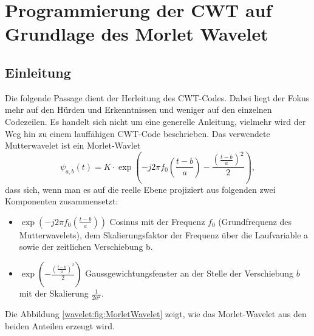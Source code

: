 %
%
%
%
\section{Programmierung der CWT auf Grundlage des Morlet Wavelet 
\label{wavelets:section:teil2}}

\subsection{Einleitung
\label{wavelets:subsection:Einleitung}}
Die folgende Passage dient der Herleitung des CWT-Codes. Dabei liegt der Fokus mehr auf den Hürden und Erkenntnissen und weniger auf den einzelnen Codezeilen. Es handelt sich nicht um eine generelle Anleitung, vielmehr wird der Weg hin zu einem lauffähigen CWT-Code beschrieben.
Das verwendete Mutterwavelet ist ein Morlet-Wavlet \cite{wavelets:Wikipedia}
\begin{equation}
	\psi_{a,b}(t)=K\cdot\exp\left(-j2\pi f_0\left(\frac{t-b}{a}\right)-\frac{\left(\frac{t-b}{a}\right)^2}{2}\right),
	\label{wavelets:equation6}
\end{equation}
dass sich, wenn man es auf die reelle Ebene projiziert aus folgenden zwei Komponenten zusammensetzt: 

\begin{itemize}
	\item $\exp\left(-j2\pi f_0\left(\frac{t-b}{a}\right)\right)$ Cosinus mit der Frequenz $f_0$ (Grundfrequenz des Mutterwavelets), dem Skalierungsfaktor der Frequenz über die Laufvariable a sowie der zeitlichen Verschiebung b.
	\item $\exp\left(-\frac{\left(\frac{t-b}{a}\right)^2}{2}\right)$	Gaussgewichtungsfenster an der Stelle der Verschiebung $b$ mit der Skalierung $\frac{1}{2a^2}$.
\end{itemize}

Die Abbildung \ref{wavelet:fig:MorletWavelet} zeigt, wie das Morlet-Wavelet aus den beiden Anteilen erzeugt wird.

